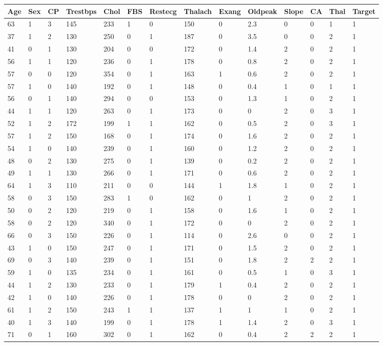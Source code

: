 \documentclass{article}
\begin{document}
	 \hspace*{-50cm} 
\begin{longtable}{|l|l|l|l|l|l|l|l|l|l|l|l|l|l|}
		\hline
		\textbf{Age} & \textbf{Sex} & \textbf{CP} & \textbf{Trestbps} & \textbf{Chol} & \textbf{FBS} & \textbf{Restecg} & \textbf{Thalach} & \textbf{Exang} & \textbf{Oldpeak} & \textbf{Slope} & \textbf{CA} & \textbf{Thal} & \textbf{Target} \\
		\hline
63&1&3&145&233&1&0&150&0&2.3&0&0&1&1 \\ 
37&1&2&130&250&0&1&187&0&3.5&0&0&2&1 \\ 
41&0&1&130&204&0&0&172&0&1.4&2&0&2&1 \\ 
56&1&1&120&236&0&1&178&0&0.8&2&0&2&1 \\ 
57&0&0&120&354&0&1&163&1&0.6&2&0&2&1 \\ 
57&1&0&140&192&0&1&148&0&0.4&1&0&1&1 \\ 
56&0&1&140&294&0&0&153&0&1.3&1&0&2&1 \\ 
44&1&1&120&263&0&1&173&0&0&2&0&3&1 \\ 
52&1&2&172&199&1&1&162&0&0.5&2&0&3&1 \\ 
57&1&2&150&168&0&1&174&0&1.6&2&0&2&1 \\ 
54&1&0&140&239&0&1&160&0&1.2&2&0&2&1 \\ 
48&0&2&130&275&0&1&139&0&0.2&2&0&2&1 \\ 
49&1&1&130&266&0&1&171&0&0.6&2&0&2&1 \\ 
64&1&3&110&211&0&0&144&1&1.8&1&0&2&1 \\ 
58&0&3&150&283&1&0&162&0&1&2&0&2&1 \\ 
50&0&2&120&219&0&1&158&0&1.6&1&0&2&1 \\ 
58&0&2&120&340&0&1&172&0&0&2&0&2&1 \\ 
66&0&3&150&226&0&1&114&0&2.6&0&0&2&1 \\ 
43&1&0&150&247&0&1&171&0&1.5&2&0&2&1 \\ 
69&0&3&140&239&0&1&151&0&1.8&2&2&2&1 \\ 
59&1&0&135&234&0&1&161&0&0.5&1&0&3&1 \\ 
44&1&2&130&233&0&1&179&1&0.4&2&0&2&1 \\ 
42&1&0&140&226&0&1&178&0&0&2&0&2&1 \\ 
61&1&2&150&243&1&1&137&1&1&1&0&2&1 \\ 
40&1&3&140&199&0&1&178&1&1.4&2&0&3&1 \\ 
71&0&1&160&302&0&1&162&0&0.4&2&2&2&1 \\ 

\end{longtable}
\end{document}
